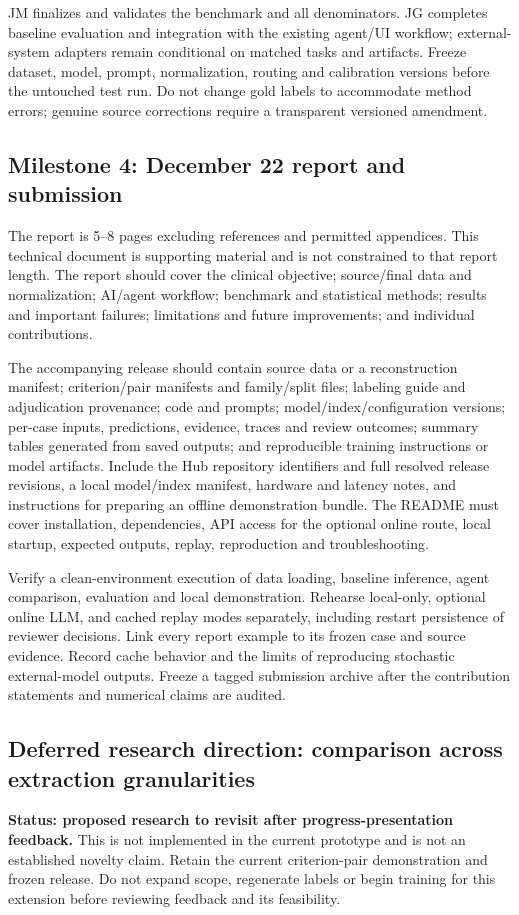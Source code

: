 \documentclass[10pt,letterpaper]{article}
\begin{document}
JM finalizes and validates the benchmark and all denominators. JG completes
baseline evaluation and integration with the existing agent/UI workflow;
external-system adapters remain conditional on matched tasks and artifacts. Freeze dataset, model, prompt,
normalization, routing and calibration versions before the untouched test
run. Do not change gold labels to accommodate method errors; genuine source
corrections require a transparent versioned amendment.

\subsection{Milestone 4: December 22 report and submission}
The report is 5--8 pages excluding references and permitted appendices. This
technical document is supporting material and is not constrained to that
report length. The report should cover the clinical objective; source/final
data and normalization; AI/agent workflow; benchmark and statistical methods;
results and important failures; limitations and future improvements; and
individual contributions.

The accompanying release should contain source data or a reconstruction
manifest; criterion/pair manifests and family/split files; labeling guide and
adjudication provenance; code and prompts; model/index/configuration versions;
per-case inputs, predictions, evidence, traces and review outcomes; summary
tables generated from saved outputs; and reproducible training instructions
or model artifacts. Include the Hub repository identifiers and full resolved
release revisions, a local model/index manifest, hardware and latency notes,
and instructions for preparing an offline demonstration bundle. The README
must cover installation, dependencies, API access for the optional online
route, local startup, expected outputs, replay, reproduction and troubleshooting.

Verify a clean-environment execution of data loading, baseline inference,
agent comparison, evaluation and local demonstration. Rehearse local-only,
optional online LLM, and cached replay modes separately, including restart
persistence of reviewer decisions. Link every report example to
its frozen case and source evidence. Record cache behavior and the limits of
reproducing stochastic external-model outputs. Freeze a tagged submission
archive after the contribution statements and numerical claims are audited.

\subsection{Deferred research direction: comparison across extraction granularities}
\label{sec:deferrednovelty}
\textbf{Status: proposed research to revisit after progress-presentation feedback.}
This is not implemented in the current prototype and is not an established
novelty claim. Retain the current criterion-pair demonstration and frozen
release. Do not expand scope, regenerate labels or begin training for this
extension before reviewing feedback and its feasibility.
\end{document}
